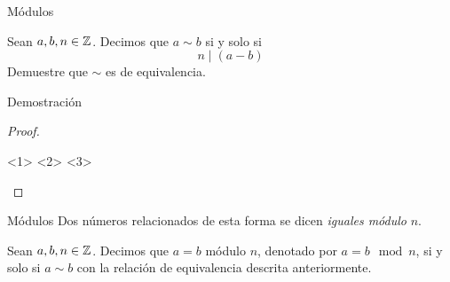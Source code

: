 \begin{frame}
	
\end{frame}
\begin{frame}{Módulos}
	\begin{exercise}
		Sean $ a, b, n\in\mathbb{Z}^{} $. Decimos que $ a\sim b $ si y solo si
		\[ n\mid(a - b) \]
		Demuestre que $ \sim $ es de equivalencia.
	\end{exercise}
\end{frame}
\begin{frame}{Demostración}
	\begin{proof}
		\begin{itemize}
			<1>
			<2>
			<3>
		\end{itemize}
	\end{proof}
\end{frame}
\begin{frame}{Módulos}
	Dos números relacionados de esta forma se dicen \emph{iguales módulo} $ n $.
	\begin{mdefinition}[Módulo]
		Sean $ a, b, n\in\mathbb{Z}^{} $. Decimos que $ a = b $ módulo $ n $, denotado por $ a = b\mod n $, si y solo si $ a\sim b $ con la relación de equivalencia descrita anteriormente.
	\end{mdefinition}
\end{frame}
